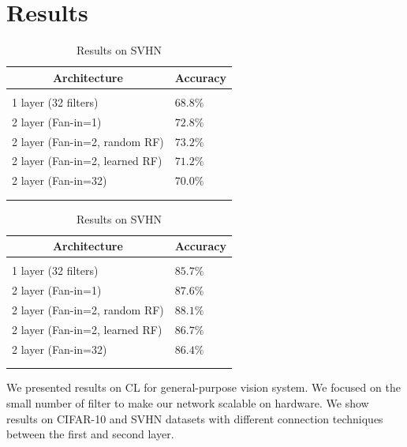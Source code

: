 \documentclass{article} %
\begin{document}
\section{Results}
\label{sec-results}

\begin {table}
\parbox{.5\linewidth}{
\caption{Results on CIFAR-10}
\label{resuts-cifar10}
\begin{center}
\begin{tabular}{ll}
\multicolumn{1}{c}{\bf Architecture}  &\multicolumn{1}{c}{\bf Accuracy}
\\ \hline \\
1 layer (32 filters)                            & $68.8\%$\\
2 layer (Fan-in=1)                            &$72.8\%$ \\
2 layer (Fan-in=2, random RF)            &$73.2\%$ \\
2 layer (Fan-in=2, learned RF)            &$71.2\%$\\
2 layer (Fan-in=32)                          &$70.0\%$\\
\\ \hline \\
\end{tabular}
\end{center}
}
\parbox{.5\linewidth}{
\caption{Results on SVHN}
\label{resuts-svhn}
\begin{center}
\begin{tabular}{ll}
\multicolumn{1}{c}{\bf Architecture}  &\multicolumn{1}{c}{\bf Accuracy}
\\ \hline \\
1 layer (32 filters)                          & $85.7\%$\\
2 layer (Fan-in=1)                           &$87.6\%$ \\
2 layer (Fan-in=2, random RF)           &$88.1\%$ \\
2 layer (Fan-in=2, learned RF)           &$86.7\%$\\
2 layer (Fan-in=32)                        &$86.4\%$\\
\\ \hline \\
\end{tabular}
\end{center}
}
\end{table}



We presented results on CL for general-purpose vision system.
We focused on the small number of filter to make our network scalable on hardware.
We show results on CIFAR-10 and SVHN datasets with different connection techniques between the first and second layer. 
\end{document}
